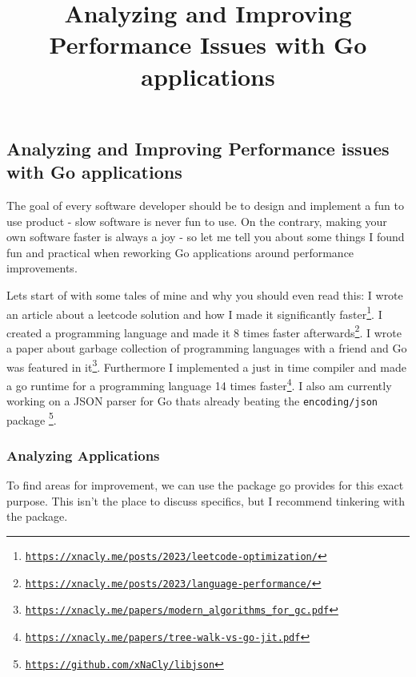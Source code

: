 

\title{Analyzing and Improving Performance Issues with Go applications}


    \subsection*{Analyzing and Improving Performance issues with Go applications}

    The goal of every software developer should be to design and implement a
    fun to use product - slow software is never fun to use. On the contrary,
    making your own software faster is always a joy - so let me tell you about
    some things I found fun and practical when reworking Go applications around
    performance improvements.

    Lets start of with some tales of mine and why you should even read this: I
    wrote an article about a leetcode solution and how I made it significantly
    faster\footnote{\href{https://xnacly.me/posts/2023/leetcode-optimization/}{\texttt{https://xnacly.me/posts/2023/leetcode-optimization/}}}.
    I created a programming language and made it 8 times faster
    afterwards\footnote{\href{https://xnacly.me/posts/2023/language-performance/}{\texttt{https://xnacly.me/posts/2023/language-performance/}}}.
    I wrote a paper about garbage collection of programming languages with a
    friend and Go was featured in
    it\footnote{\href{https://xnacly.me/papers/modern_algorithms_for_gc.pdf}{\texttt{https://xnacly.me/papers/modern\_algorithms\_for\_gc.pdf}}}.
    Furthermore I implemented a just in time compiler and made a go runtime for
    a programming language 14 times
    faster\footnote{\href{https://xnacly.me/papers/tree-walk-vs-go-jit.pdf}{\texttt{https://xnacly.me/papers/tree-walk-vs-go-jit.pdf}}}.
    I also am currently working on a JSON parser for Go thats already beating
    the \texttt{encoding/json} package
    \footnote{\href{https://github.com/xNaCly/libjson}{\texttt{https://github.com/xNaCly/libjson}}}.

    \subsubsection*{Analyzing Applications}

    To find areas for improvement, we can use the package go provides for this
    exact purpose. This isn't the place to discuss specifics, but I recommend
    tinkering with the package.


